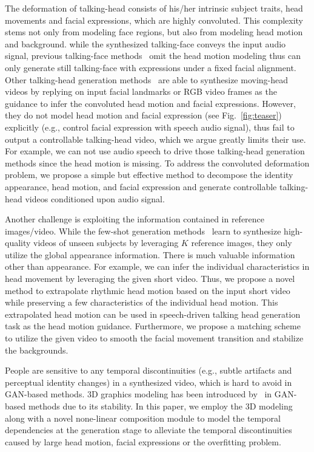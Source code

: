 \documentclass[runningheads]{llncs}
\begin{document}
The deformation of talking-head consists of his/her intrinsic subject traits, head movements and facial expressions, which are highly convoluted. This complexity stems not only from modeling face regions, but also from modeling head motion and background. while the synthesized talking-face conveys the input audio signal, previous talking-face methods~\cite{Chung18b,wiles2018x2face,zhou2019talking,chen2018lip,ijcai2019-129,chen2019hierarchical} omit the head motion modeling thus can only generate still talking-face with expressions under a fixed facial alignment. Other talking-head generation methods~\cite{zakharov2019few,wang2018fewshotvid2vid,wang2018vid2vid,wang2018high,wiles2018x2face} are able to synthesize moving-head videos by replying on input facial landmarks or RGB video frames as the guidance to infer the convoluted head motion and facial expressions. However, they do not model head motion and facial expression (see Fig.~\ref{fig:teaser}) explicitly (e.g., control facial expression with speech audio signal), thus fail to output a controllable talking-head video, which we argue greatly limits their use. For example, we can not use audio speech to drive those talking-head generation methods since the head motion is missing. To address the convoluted deformation problem, we propose a simple but effective method to decompose the identity appearance, head motion, and facial expression and generate controllable talking-head videos conditioned upon audio signal.     

Another challenge is exploiting the information contained in reference images/video. While the few-shot generation methods~\cite{zakharov2019few,wang2018fewshotvid2vid,liu2019few} learn to synthesize high-quality videos of unseen subjects by leveraging $K$ reference images, they only utilize the global appearance information. There is much valuable information other than appearance. For example, we can infer the individual characteristics in head movement by leveraging the given short video. Thus, we propose a novel method to extrapolate rhythmic head motion based on the input short video while preserving a few characteristics of the individual head motion. This extrapolated head motion can be used in speech-driven talking head generation task as the head motion guidance. Furthermore, we propose a matching scheme to utilize the given video to smooth the facial movement transition and stabilize the backgrounds.

People are sensitive to any temporal discontinuities (e.g., subtle artifacts and perceptual identity changes) in a synthesized video, which is hard to avoid in GAN-based methods. 3D graphics modeling has been introduced by~\cite{Fried19,kim2018deep} in GAN-based methods due to its stability. In this paper, we employ the 3D modeling along with a novel none-linear composition module to model the temporal dependencies at the generation stage to alleviate the temporal discontinuities caused by large head motion, facial expressions or the overfitting problem.
\end{document}
